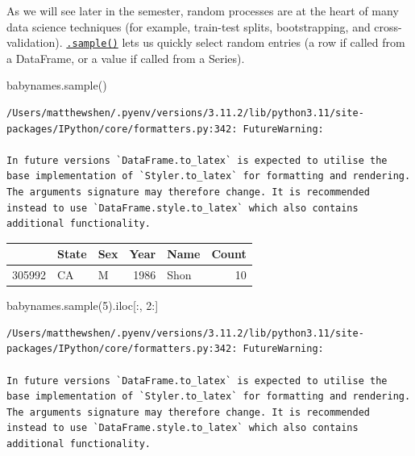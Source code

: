 \documentclass[
  letterpaper,
  DIV=11,
  numbers=noendperiod]{scrreprt}
\newenvironment{Shaded}{\begin{snugshade}}{\end{snugshade}}
\newcommand{\DecValTok}[1]{\textcolor[rgb]{0.68,0.00,0.00}{#1}}
\newcommand{\NormalTok}[1]{\textcolor[rgb]{0.00,0.23,0.31}{#1}}
\begin{document}
As we will see later in the semester, random processes are at the heart
of many data science techniques (for example, train-test splits,
bootstrapping, and cross-validation).
\href{https://pandas.pydata.org/docs/reference/api/pandas.DataFrame.sample.html}{\texttt{.sample()}}
lets us quickly select random entries (a row if called from a DataFrame,
or a value if called from a Series).

\begin{Shaded}
\begin{Highlighting}[]
\NormalTok{babynames.sample()}
\end{Highlighting}
\end{Shaded}

\begin{verbatim}
/Users/matthewshen/.pyenv/versions/3.11.2/lib/python3.11/site-packages/IPython/core/formatters.py:342: FutureWarning:

In future versions `DataFrame.to_latex` is expected to utilise the base implementation of `Styler.to_latex` for formatting and rendering. The arguments signature may therefore change. It is recommended instead to use `DataFrame.style.to_latex` which also contains additional functionality.
\end{verbatim}

\begin{tabular}{lllrlr}
\toprule
{} & State & Sex &  Year &  Name &  Count \\
\midrule
305992 &    CA &   M &  1986 &  Shon &     10 \\
\bottomrule
\end{tabular}

\begin{Shaded}
\begin{Highlighting}[]
\NormalTok{babynames.sample(}\DecValTok{5}\NormalTok{).iloc[:, }\DecValTok{2}\NormalTok{:]}
\end{Highlighting}
\end{Shaded}

\begin{verbatim}
/Users/matthewshen/.pyenv/versions/3.11.2/lib/python3.11/site-packages/IPython/core/formatters.py:342: FutureWarning:

In future versions `DataFrame.to_latex` is expected to utilise the base implementation of `Styler.to_latex` for formatting and rendering. The arguments signature may therefore change. It is recommended instead to use `DataFrame.style.to_latex` which also contains additional functionality.
\end{verbatim}
\end{document}
